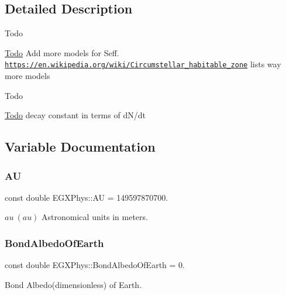 \subsection{Detailed Description}
\begin{DoxyRefDesc}{Todo}
\item[\hyperlink{todo__todo000001}{Todo}]Add more models for Seff. \href{https://en.wikipedia.org/wiki/Circumstellar_habitable_zone}{\tt https\+://en.\+wikipedia.\+org/wiki/\+Circumstellar\+\_\+habitable\+\_\+zone} lists way more models \end{DoxyRefDesc}


\begin{DoxyRefDesc}{Todo}
\item[\hyperlink{todo__todo000002}{Todo}]decay constant in terms of d\+N/dt \end{DoxyRefDesc}


\subsection{Variable Documentation}
\mbox{\label{namespace_e_g_x_phys_a999332303a2214425184fbe23dbae0c5}} 
\subsubsection{\texorpdfstring{AU}{AU}}
{\footnotesize\ttfamily const double E\+G\+X\+Phys\+::\+AU = 149597870700.}

$au\ (au)$ Astronomical units in meters. \mbox{\label{namespace_e_g_x_phys_a932fff28fce4321fdbf9abc5c1783dc9}} 
\subsubsection{\texorpdfstring{Bond\+Albedo\+Of\+Earth}{BondAlbedoOfEarth}}
{\footnotesize\ttfamily const double E\+G\+X\+Phys\+::\+Bond\+Albedo\+Of\+Earth = 0.}

Bond Albedo(dimensionless) of Earth. \mbox{\label{namespace_e_g_x_phys_a24d985ae6f6cefe7e25ac40806b88f79}} 
